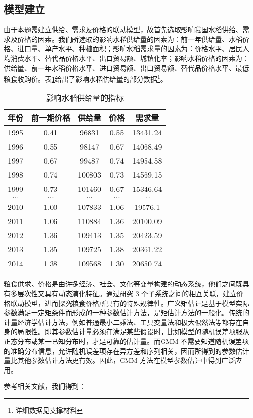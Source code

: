 \documentclass[withoutpreface,bwprint]{cumcmthesis} %
\begin{document}
		\subsection{模型建立}
由于本题需建立供给、需求及价格的联动模型，故首先选取影响我国水稻供给、需求及价格的因素。我们所选取的影响水稻供给量的因素为：前一年供给量、水稻价格、进口量、单产水平、种植面积；影响水稻需求量的因素为：价格水平、居民人均消费水平、替代品价格水平、出口贸易额、城镇化率；影响水稻价格的因素为：供给量、前一年水稻价格水平、进口贸易额、出口贸易额、替代品价格水平、最低粮食收购价。表\ref{tab:gj}给出了影响水稻供给量的部分数据\footnote{详细数据见支撑材料}。\par
\begin{table}[htbp]
  \centering
  \caption{影响水稻供给量的指标}
    \begin{tabular}{ccccc}
    \toprule[2pt]
     年份     & 前一期价格& 供给量 & 价格 & 需求量\\
    \midrule[1.5pt]
    1995  & 0.41  & 96831 & 0.55  & 13431.24 \\
    1996  & 0.55  & 98147 & 0.67  & 14068.49 \\
    1997  & 0.67  & 99487 & 0.74  & 14954.58 \\
    1998  & 0.74  & 100803 & 0.73  & 14569.15 \\
    1999  & 0.73  & 101460 & 0.67  & 15346.64 \\
	$\ldots$&$\ldots$&$\ldots$&$\ldots$&$\ldots$ \\
    2010  & 1.00  & 107833 & 1.06  & 19576.1 \\
    2011  & 1.06  & 110884 & 1.36  & 20100.09 \\
    2012  & 1.36  & 109413 & 1.35  & 20423.59 \\
    2013  & 1.35  & 109725 & 1.38  & 20361.22 \\
    2014  & 1.38  & 109568 & 1.30  & 20650.74 \\
    \bottomrule[2pt]
    \end{tabular}%
  \label{tab:gj}%
\end{table}%
粮食供求、价格是由许多经济、社会、文化等变量构建的动态系统，他们之间既具有多层次性又具有动态演化特征。通过研究 3 个子系统之间的相互关联，建立价格联动模型，进而探究粮食价格所具有的特殊规律性。广义矩估计是基于模型实际参数满足一定矩条件而形成的一种参数估计方法，是矩估计方法的一般化。传统的计量经济学估计方法，例如普通最小二乘法、工具变量法和极大似然法等都存在自身的局限性。即其参数估计量必须在满足某些假设时，比如模型的随机误差项服从正态分布或某一已知分布时，才是可靠的估计量。而GMM 不需要知道随机误差项的准确分布信息，允许随机误差项存在异方差和序列相关，因而所得到的参数估计量比其他参数估计方法更有效。因此，GMM 方法在模型参数估计中得到广泛应用。\par
参考相关文献，我们得到：\par		
\end{document}
